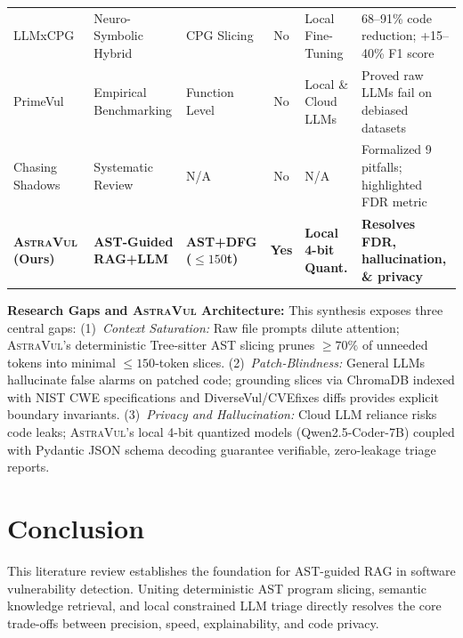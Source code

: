 \documentclass[10pt,twocolumn]{article}
\begin{document}
\begin{table}[!t]
\begin{tabular}{|p{2.5cm}|p{3.2cm}|p{2.0cm}|c|p{2.1cm}|p{5.6cm}|}
LLMxCPG~\cite{lekssays2025llmxcpg} & Neuro-Symbolic Hybrid & CPG Slicing & No & Local Fine-Tuning & 68--91\% code reduction; +15--40\% F1 score \\
PrimeVul~\cite{zhang2025howfar} & Empirical Benchmarking & Function Level & No & Local \& Cloud LLMs & Proved raw LLMs fail on debiased datasets \\
Chasing Shadows~\cite{arp2026chasingshadows} & Systematic Review & N/A & No & N/A & Formalized 9 pitfalls; highlighted FDR metric \\
\hline
\textbf{\textsc{AstraVul} (Ours)} & \textbf{AST-Guided RAG+LLM} & \textbf{AST+DFG ($\le 150$t)} & \textbf{Yes} & \textbf{Local 4-bit Quant.} & \textbf{Resolves FDR, hallucination, \& privacy} \\
\hline
\end{tabular}
\end{table}

\vspace{2pt}\noindent\textbf{Research Gaps and \textsc{AstraVul} Architecture:}
This synthesis exposes three central gaps: (1)~\textit{Context Saturation:} Raw file prompts dilute attention; \textsc{AstraVul}'s deterministic Tree-sitter AST slicing prunes $\ge 70\%$ of unneeded tokens into minimal $\le 150$-token slices. (2)~\textit{Patch-Blindness:} General LLMs hallucinate false alarms on patched code; grounding slices via ChromaDB indexed with NIST CWE specifications and DiverseVul/CVEfixes diffs provides explicit boundary invariants. (3)~\textit{Privacy and Hallucination:} Cloud LLM reliance risks code leaks; \textsc{AstraVul}'s local 4-bit quantized models (Qwen2.5-Coder-7B) coupled with Pydantic JSON schema decoding guarantee verifiable, zero-leakage triage reports.

\section{Conclusion}
This literature review establishes the foundation for AST-guided RAG in software vulnerability detection. Uniting deterministic AST program slicing, semantic knowledge retrieval, and local constrained LLM triage directly resolves the core trade-offs between precision, speed, explainability, and code privacy.
\end{document}
